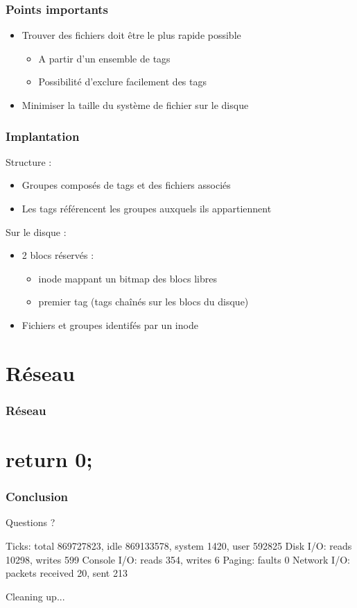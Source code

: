 \documentclass{beamer}
\begin{document}
\begin{frame}
  \frametitle{Points importants}
  \begin{itemize}
  \item Trouver des fichiers doit être le plus rapide possible
    \begin{itemize}
      \item A partir d'un ensemble de tags
      \item Possibilité d'exclure facilement des tags
    \end{itemize}
  \item Minimiser la taille du système de fichier sur le disque
  \end{itemize}
\end{frame}

\begin{frame}
  \frametitle{Implantation}
  Structure :
  \begin{itemize}
  \item Groupes composés de tags et des fichiers associés
  \item Les tags référencent les groupes auxquels ils appartiennent
  \end{itemize}

  Sur le disque :
  \begin{itemize}
  \item 2 blocs réservés :
    \begin{itemize}
    \item inode mappant un bitmap des blocs libres
    \item premier tag (tags chaînés sur les blocs du disque)
    \end{itemize}
  \item Fichiers et groupes identifés par un inode
  \end{itemize}
\end{frame}

\section{Réseau}
\begin{frame}
  \frametitle{Réseau}
\end{frame}


\section*{return 0;}

\begin{frame}[fragile]
  \frametitle{Conclusion}
\begin{verbaterm}[fontsize=\scriptsize]
Questions ?

Ticks: total 869727823, idle 869133578, system 1420, user 592825
Disk I/O: reads 10298, writes 599
Console I/O: reads 354, writes 6
Paging: faults 0
Network I/O: packets received 20, sent 213

Cleaning up...
\end{verbaterm}

\end{frame}
\end{document}
